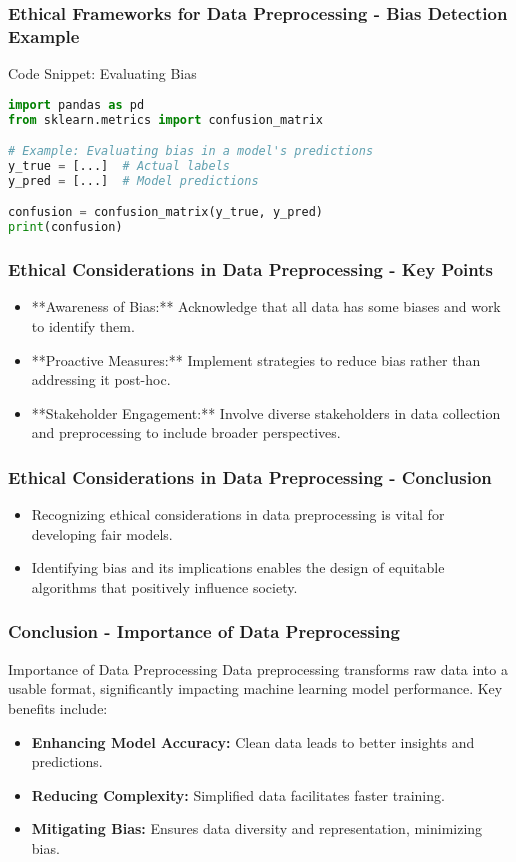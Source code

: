 \documentclass[aspectratio=169]{beamer}
\begin{document}
\begin{frame}[fragile]
    \frametitle{Ethical Frameworks for Data Preprocessing - Bias Detection Example}
    \begin{block}{Code Snippet: Evaluating Bias}
    \begin{lstlisting}[language=Python]
import pandas as pd
from sklearn.metrics import confusion_matrix

# Example: Evaluating bias in a model's predictions
y_true = [...]  # Actual labels
y_pred = [...]  # Model predictions

confusion = confusion_matrix(y_true, y_pred)
print(confusion)
    \end{lstlisting}
    \end{block}
\end{frame}

\begin{frame}[fragile]
    \frametitle{Ethical Considerations in Data Preprocessing - Key Points}
    \begin{itemize}
        \item **Awareness of Bias:** Acknowledge that all data has some biases and work to identify them.
        \item **Proactive Measures:** Implement strategies to reduce bias rather than addressing it post-hoc.
        \item **Stakeholder Engagement:** Involve diverse stakeholders in data collection and preprocessing to include broader perspectives.
    \end{itemize}
\end{frame}

\begin{frame}[fragile]
    \frametitle{Ethical Considerations in Data Preprocessing - Conclusion}
    \begin{itemize}
        \item Recognizing ethical considerations in data preprocessing is vital for developing fair models.
        \item Identifying bias and its implications enables the design of equitable algorithms that positively influence society.
    \end{itemize}
\end{frame}

\begin{frame}[fragile]
    \frametitle{Conclusion - Importance of Data Preprocessing}
    \begin{block}{Importance of Data Preprocessing}
        Data preprocessing transforms raw data into a usable format, significantly impacting machine learning model performance. Key benefits include:
    \end{block}
    \begin{itemize}
        \item \textbf{Enhancing Model Accuracy:} Clean data leads to better insights and predictions.
        \item \textbf{Reducing Complexity:} Simplified data facilitates faster training.
        \item \textbf{Mitigating Bias:} Ensures data diversity and representation, minimizing bias.
    \end{itemize}
\end{frame}
\end{document}
